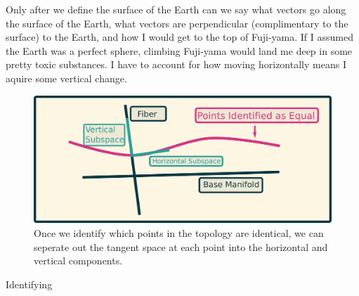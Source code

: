   Only after we define the surface of the Earth can we say what vectors go along the surface of the Earth, what vectors are perpendicular (complimentary to the surface) to the Earth, and how I would get to the top of Fuji-yama.  If I assumed the Earth was a perfect sphere, climbing Fuji-yama would land me deep in some pretty toxic substances.  I have to account for how moving horizontally means I aquire some vertical change.

\begin{figure}
  \includegraphics[width=\textwidth]{pics/bundle_tangent.png}
  \caption{Once we identify which points in the topology are identical, we can seperate out the tangent space at each point into the horizontal and vertical components.}
  \label{fig:bundle_tangent}
\end{figure}

Identifying 
